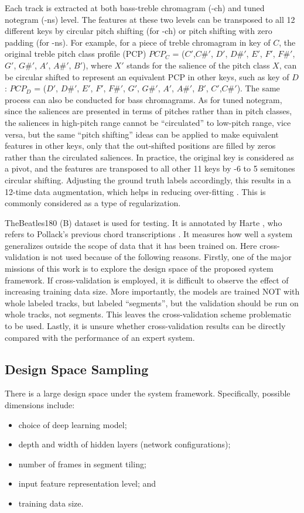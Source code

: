 Each track is extracted at both bass-treble chromagram (-ch) and tuned notegram (-ns) level. The features at these two levels can be transposed to all 12 different keys by circular pitch shifting (for -ch) or pitch shifting with zero padding (for -ns). For example, for a piece of treble chromagram in key of $C$, the original treble pitch class profile (PCP) $PCP_C$ = ($C'$,$C\#'$, $D'$, $D\#'$, $E'$, $F'$, $F\#'$, $G'$, $G\#'$, $A'$, $A\#'$, $B'$), where $X'$ stands for the salience of the pitch class $X$, can be circular shifted to represent an equivalent PCP in other keys, such as key of $D$: $PCP_D$ = ($D'$, $D\#'$, $E'$, $F'$, $F\#'$, $G'$, $G\#'$, $A'$, $A\#'$, $B'$, $C'$,$C\#'$). The same process can also be conducted for bass chromagrams. As for tuned notegram, since the saliences are presented in terms of pitches rather than in pitch classes, the saliences in high-pitch range cannot be ``circulated'' to low-pitch range, vice versa, but the same ``pitch shifting'' ideas can be applied to make equivalent features in other keys, only that the out-shifted positions are filled by zeros rather than the circulated saliences. In practice, the original key is considered as a pivot, and the features are transposed to all other 11 keys by -6 to 5 semitones circular shifting. Adjusting the ground truth labels accordingly, this results in a 12-time data augmentation, which helps in reducing over-fitting \cite{cho2014improved,humphrey2015exploration}. This is commonly considered as a type of regularization.

TheBeatles180 (B) dataset is used for testing. It is annotated by Harte \cite{harte2010towards}, who refers to Pollack's previous chord transcriptions \cite{pollack2000notes}. It measures how well a system generalizes outside the scope of data that it has been trained on. Here cross-validation is not used because of the following reasons. Firstly, one of the major missions of this work is to explore the design space of the proposed system framework. If cross-validation is employed, it is difficult to observe the effect of increasing training data size. More importantly, the models are trained NOT with whole labeled tracks, but labeled ``segments'', but the validation should be run on whole tracks, not segments. This leaves the cross-validation scheme problematic to be used. Lastly, it is unsure whether cross-validation results can be directly compared with the performance of an expert system.

\subsection{Design Space Sampling}
There is a large design space under the system framework. Specifically, possible dimensions include:
\begin{itemize}
\item choice of deep learning model; 
\item depth and width of hidden layers (network configurations);
\item number of frames in segment tiling;
\item input feature representation level; and
\item training data size.
\end{itemize}

